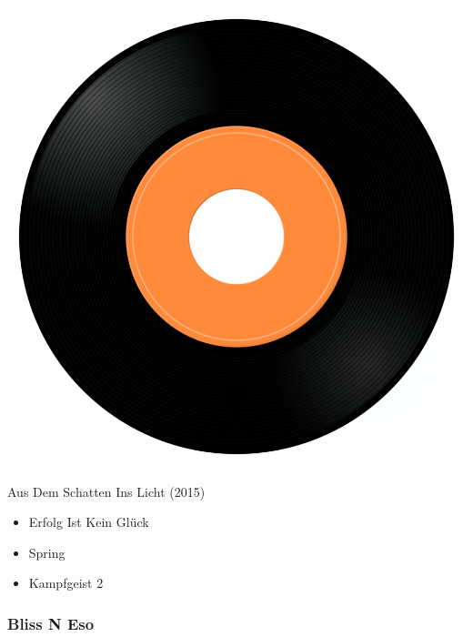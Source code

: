\begin{minipage}[t]{0.25\textwidth}\vspace{0pt}
\captionsetup{type=figure}
\includegraphics[width=\textwidth]{Images/cover.png}
\caption*{Aus Dem Schatten Ins Licht (2015)}
\end{minipage}
\begin{minipage}[t]{0.25\textwidth}\vspace{0pt}
\begin{itemize}[nosep,leftmargin=1em,labelwidth=*,align=left]
	\setlength{\itemsep}{0pt}
	\item Erfolg Ist Kein Glück
	\item Spring
	\item Kampfgeist 2
\end{itemize}
\end{minipage}

\subsubsection{Bliss N Eso}

